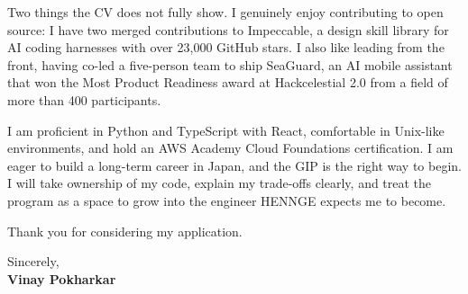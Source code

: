 \documentclass[11pt, letterpaper]{article}
\begin{document}
Two things the CV does not fully show. I genuinely enjoy contributing to open source: I have two merged contributions to Impeccable, a design skill library for AI coding harnesses with over 23,000 GitHub stars. I also like leading from the front, having co-led a five-person team to ship SeaGuard, an AI mobile assistant that won the Most Product Readiness award at Hackcelestial 2.0 from a field of more than 400 participants.

I am proficient in Python and TypeScript with React, comfortable in Unix-like environments, and hold an AWS Academy Cloud Foundations certification. I am eager to build a long-term career in Japan, and the GIP is the right way to begin. I will take ownership of my code, explain my trade-offs clearly, and treat the program as a space to grow into the engineer HENNGE expects me to become.

Thank you for considering my application.

\vspace{0.2cm}

Sincerely,\\[4pt]
\textbf{Vinay Pokharkar}
\end{document}
